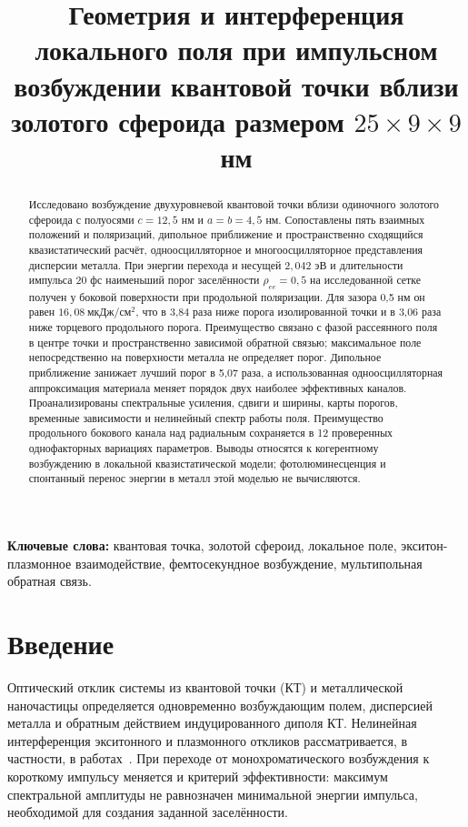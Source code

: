 \documentclass[12pt,a4paper]{article}
\title{Геометрия и интерференция локального поля при импульсном возбуждении квантовой точки вблизи золотого сфероида размером $25\times9\times9$ нм}
\author{}
\date{}
\newcommand{\uJ}{\text{мкДж}/\text{см}^{2}}
\begin{document}
\maketitle
\begin{abstract}
Исследовано возбуждение двухуровневой квантовой точки вблизи одиночного
золотого сфероида с полуосями $c=12{,}5$ нм и $a=b=4{,}5$ нм. Сопоставлены
пять взаимных положений и поляризаций, дипольное приближение и пространственно
сходящийся квазистатический расчёт, одноосцилляторное и многоосцилляторное
представления дисперсии металла. При энергии перехода и несущей
$2{,}042$ эВ и длительности импульса 20 фс наименьший порог заселённости
$\rho_{ee}=0{,}5$ на исследованной сетке получен у боковой поверхности
при продольной поляризации. Для зазора 0,5 нм он равен
$16{,}08\ \uJ$, что в 3,84 раза ниже порога изолированной точки
и в 3,06 раза ниже торцевого продольного порога. Преимущество связано
с фазой рассеянного поля в центре точки и пространственно зависимой обратной
связью; максимальное поле непосредственно на поверхности металла не определяет
порог. Дипольное приближение занижает лучший порог в 5,07 раза,
а использованная одноосцилляторная аппроксимация материала меняет порядок
двух наиболее эффективных каналов. Проанализированы спектральные усиления,
сдвиги и ширины, карты порогов, временные зависимости и нелинейный спектр
работы поля. Преимущество продольного бокового канала над радиальным
сохраняется в 12 проверенных однофакторных вариациях параметров.
Выводы относятся к когерентному возбуждению в локальной
квазистатической модели; фотолюминесценция и спонтанный перенос энергии
в металл этой моделью не вычисляются.
\end{abstract}
\noindent\textbf{Ключевые слова:} квантовая точка, золотой сфероид, локальное
поле, экситон-плазмонное взаимодействие, фемтосекундное возбуждение,
мультипольная обратная связь.

\section{Введение}
Оптический отклик системы из квантовой точки (КТ) и металлической
наночастицы определяется одновременно возбуждающим полем, дисперсией
металла и обратным действием индуцированного диполя КТ. Нелинейная
интерференция экситонного и плазмонного откликов рассматривается, в
частности, в работах~\cite{zhang2006,shah2013}. При переходе от
монохроматического возбуждения к короткому импульсу меняется и критерий
эффективности: максимум спектральной амплитуды не равнозначен минимальной
энергии импульса, необходимой для создания заданной заселённости.
\end{document}
